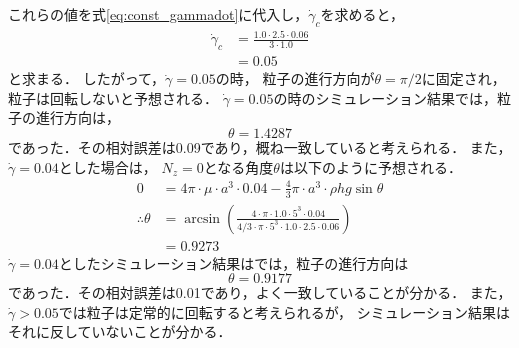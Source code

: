 これらの値を式\eqref{eq:const_gammadot}に代入し，$\dot{\gamma}_c$を求めると，
    \begin{align}
        \dot{\gamma}_c
        &= \frac{1.0 \cdot 2.5 \cdot 0.06}{3 \cdot 1.0} \\
        &= 0.05
    \end{align}
と求まる．
したがって，$\dot{\gamma} = 0.05$の時，
粒子の進行方向が$\theta = \pi / 2$に固定され，粒子は回転しないと予想される．
$\dot{\gamma} = 0.05$の時のシミュレーション結果では，粒子の進行方向は，
    \begin{equation}
        \theta = 1.4287
    \end{equation}
であった．その相対誤差は0.09であり，概ね一致していると考えられる．
また，$\dot{\gamma} = 0.04$とした場合は，
$N_z = 0$となる角度$\theta$は以下のように予想される．
    \begin{align}
        0 &= 4 \pi \cdot \mu \cdot a^3 \cdot 0.04 - \frac{4}{3} \pi \cdot a^3 \cdot \rho h g \sin{\theta} \\
        \therefore
        \theta
        &= \arcsin{\left( \frac{4 \cdot \pi \cdot 1.0 \cdot 5^3 \cdot 0.04}{4/3 \cdot \pi \cdot 5^3 \cdot 1.0 \cdot 2.5 \cdot 0.06} \right)} \\
        &= 0.9273
    \end{align}
$\dot{\gamma} = 0.04$としたシミュレーション結果はでは，粒子の進行方向は
    \begin{equation}
        \theta = 0.9177
    \end{equation}
であった．その相対誤差は0.01であり，よく一致していることが分かる．
また，$\dot{\gamma} > 0.05$では粒子は定常的に回転すると考えられるが，
シミュレーション結果はそれに反していないことが分かる．

